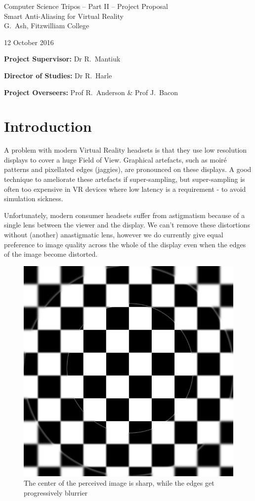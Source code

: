 \documentclass[12pt,a4paper,twoside]{article}
\begin{document}
\begin{center}
\Large
Computer Science Tripos -- Part II -- Project Proposal\\[4mm]
\LARGE
Smart Anti-Aliasing for Virtual Reality \\[4mm]

\large
G.~Ash, Fitzwilliam College

12 October 2016
\end{center}

\vspace{5mm}

\textbf{Project Supervisor:} Dr R.~Mantiuk

\textbf{Director of Studies:} Dr R.~Harle

\textbf{Project Overseers:} Prof R.~Anderson  \& Prof J.~Bacon


\section*{Introduction}

A problem with modern Virtual Reality headsets is that they use low resolution displays to cover a huge Field of View.
Graphical artefacts, such as moir\'e patterns and pixellated edges (jaggies), are pronounced on these displays.
A good technique to ameliorate these artefacts if super-sampling, but super-sampling is often too expensive in VR
devices where low latency is a requirement - to avoid simulation sickness. 

Unfortunately, modern consumer headsets suffer from astigmatism because of a single lens between the viewer and the display. We can't remove these distortions without (another) anastigmatic lens, however we do currently give equal preference to image quality across the whole of the display even when the edges of the image become distorted.

\begin{figure}[tbh]
\centerline{\includegraphics[width=0.3\linewidth]{figs/blur.png}}
\caption{The center of the perceived image is sharp, while the edges get progressively blurrier}
\label{blurfig}
\end{figure}
\end{document}
